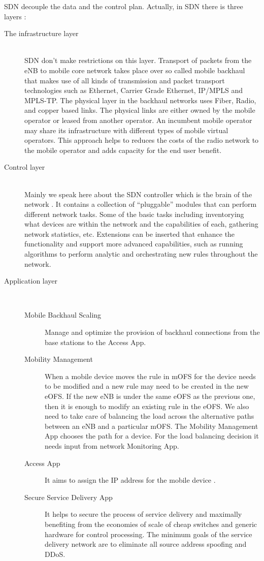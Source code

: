 \documentclass{article}
\begin{document}
SDN decouple the data and the control plan. Actually, in SDN there is
three layers :

\begin{description}
  \item[The infrastructure layer] \hfill \\ 
SDN don't make restrictions on this layer. Transport of packets from
the eNB to mobile core network takes place over so called mobile
backhaul that makes use of all kinds of transmission and packet
transport technologies such as Ethernet, Carrier Grade Ethernet,
IP/MPLS and MPLS-TP. The physical layer in the backhaul networks uses
Fiber, Radio, and copper based links. The physical links are either
owned by the mobile operator or leased from another operator. An
incumbent mobile operator may share its infrastructure with different
types of mobile virtual operators. This approach helps to reduces the
costs of the radio network to the mobile operator and adds capacity
for the end user benefit.
  \item[Control layer] \hfill \\ 
Mainly we speak here about the SDN controller which is the brain of
the network . It contains a collection of “pluggable” modules that can
perform different network tasks. Some of the basic tasks including
inventorying what devices are within the network and the capabilities
of each, gathering network statistics, etc. Extensions can be inserted
that enhance the functionality and support more advanced capabilities,
such as running algorithms to perform analytic and orchestrating new
rules throughout the network.
  \item[Application layer] \hfill \\ 


\begin{description}
  \item[Mobile Backhaul Scaling] 
Manage and optimize the provision of backhaul connections from the
base stations to the Access App.
  \item[Mobility Management] 
When a mobile device moves the rule in mOFS for the device needs to be
modified and a new rule may need to be created in the new eOFS. If the
new eNB is under the same eOFS as the previous one, then it is enough
to modify an existing rule in the eOFS. We also need to take care of
balancing the load across the alternative paths between an eNB and a
particular mOFS. The Mobility Management App chooses the path for a
device. For the load balancing decision it needs input from network
Monitoring App.
  \item[Access App]
It aims to assign the IP address for the mobile device .
  \item[Secure Service Delivery App] 
It helps to secure the process of service delivery and maximally
benefiting from the economies of scale of cheap switches and generic
hardware for control processing. The minimum goals of the service
delivery network are to eliminate all source address spoofing and
DDoS.
\end{description}

\end{description}
\end{document}
